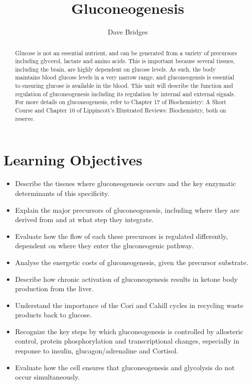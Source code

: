 \documentclass{tufte-handout}
\title{Gluconeogenesis}
\author{Dave Bridges}
\date{}  %
\begin{document}
\maketitle%

\begin{abstract}
\noindent Glucose is not an essential nutrient, and can be generated from a variety of precursors including glycerol, lactate and amino acids.  This is important because several tissues, including the brain, are highly dependent on glucose levels.  As such, the body maintains blood glucose levels in a very narrow range, and gluconeogensis is essential to ensuring glucose is available in the blood.  This unit will describe the function and regulation of gluconeogenesis including its regulation by internal and external signals.  For more details on gluconeogenesis, refer to Chapter 17 of Biochemistry: A Short Course\cite{Berg2015} and Chapter 10 of Lippincott's Illustrated Reviews: Biochemistry\cite{Ferrier2017}, both on reserve.
\end{abstract}

\tableofcontents
\pagebreak
\section{Learning Objectives}

\begin{itemize}
\item Describe the tissues where gluconeogenesis occurs and the key enzymatic determinants of this specificity.
\item Explain the major precursors of gluconeogenesis, including where they are derived from and at what step they integrate.
\item Evaluate how the flow of each these precursors is regulated differently, dependent on where they enter the gluconeogenic pathway.
\item Analyse the energetic costs of gluconeogenesis, given the precursor substrate.
\item Describe how chronic activation of gluconeogenesis results in ketone body production from the liver.
\item Understand the importance of the Cori and Cahill cycles in recycling waste products back to glucose.
\item Recognize the key steps by which gluconeogenesis is controlled by allosteric control, protein phosphorylation and transcriptional changes, especially in response to insulin, glucagon/adrenaline and Cortisol.
\item Evaluate how the cell ensures that gluconeogenesis and glycolysis do not occur simultaneously.
\end{itemize}
\end{document}
